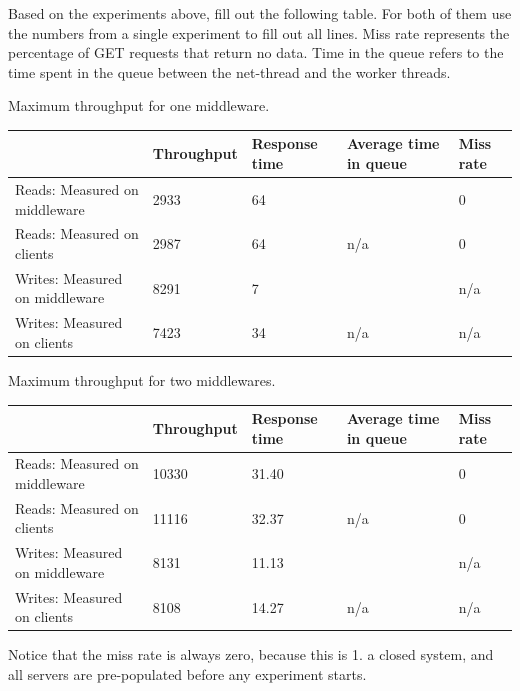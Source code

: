\documentclass[11pt,a4paper]{article}
\begin{document}
Based on the experiments above, fill out the following table. For both of them use the numbers from a single experiment to fill out all lines. Miss rate represents the percentage of GET requests that return no data. Time in the queue refers to the time spent in the queue between the net-thread and the worker threads.


\begin{center}
	{Maximum throughput for one middleware.}
	\begin{tabular}{|l|p{2cm}|p{2cm}|p{2cm}|p{2cm}|}
		\hline                                & Throughput & Response time & Average time in queue & Miss rate \\ 
		\hline Reads: Measured on middleware  & 2933 & 64 &                       &           0 \\ 
		\hline Reads: Measured on clients     & 2987 & 64 & n/a                   &           0 \\ 
		\hline Writes: Measured on middleware & 8291 & 7 &                       & n/a       \\ 
		\hline Writes: Measured on clients    & 7423 & 34 & n/a                   & n/a       \\ 
		\hline 
	\end{tabular}
\end{center}

\begin{center}
	{Maximum throughput for two middlewares.}
	\begin{tabular}{|l|p{2cm}|p{2cm}|p{2cm}|p{2cm}|}
		\hline                                & Throughput & Response time & Average time in queue & Miss rate \\ 
		\hline Reads: Measured on middleware  & 10330 & 31.40 &                       &           0\\ 
		\hline Reads: Measured on clients     & 11116 &  32.37 & n/a                   &           0\\ 
		\hline Writes: Measured on middleware & 8131 & 11.13 &                       & n/a       \\ 
		\hline Writes: Measured on clients    & 8108 & 14.27 & n/a                   & n/a       \\ 
		\hline 
	\end{tabular}
\end{center}

Notice that the miss rate is always zero, because this is 1. a closed system, and all servers are pre-populated before any experiment starts.
\end{document}
